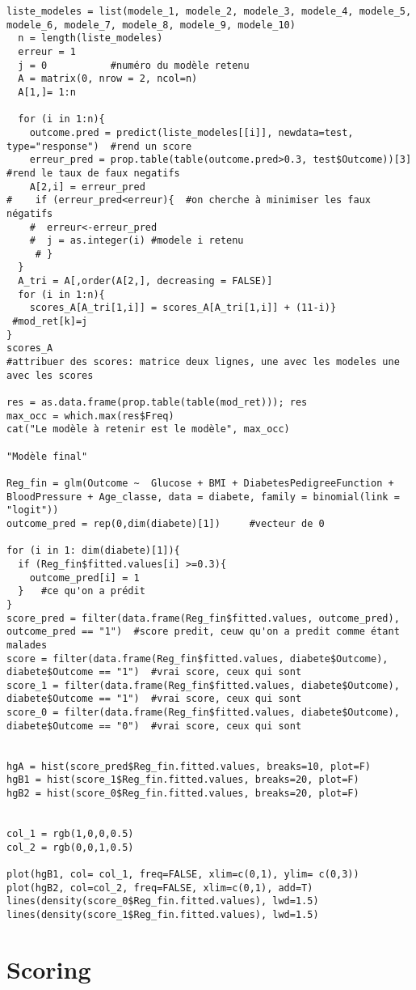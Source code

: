 \documentclass[11pt, oneside]{article}   	%
\begin{document}
\begin{lstlisting}[langage = R]
  liste_modeles = list(modele_1, modele_2, modele_3, modele_4, modele_5, modele_6, modele_7, modele_8, modele_9, modele_10)
  n = length(liste_modeles)
  erreur = 1
  j = 0           #numéro du modèle retenu
  A = matrix(0, nrow = 2, ncol=n)
  A[1,]= 1:n
  
  for (i in 1:n){
    outcome.pred = predict(liste_modeles[[i]], newdata=test, type="response")  #rend un score
    erreur_pred = prop.table(table(outcome.pred>0.3, test$Outcome))[3]   #rend le taux de faux negatifs
    A[2,i] = erreur_pred
#    if (erreur_pred<erreur){  #on cherche à minimiser les faux négatifs 
    #  erreur<-erreur_pred  
    #  j = as.integer(i) #modele i retenu
     # } 
  }
  A_tri = A[,order(A[2,], decreasing = FALSE)]
  for (i in 1:n){ 
    scores_A[A_tri[1,i]] = scores_A[A_tri[1,i]] + (11-i)}
 #mod_ret[k]=j
}
scores_A
#attribuer des scores: matrice deux lignes, une avec les modeles une avec les scores 

res = as.data.frame(prop.table(table(mod_ret))); res
max_occ = which.max(res$Freq)
cat("Le modèle à retenir est le modèle", max_occ)

"Modèle final"

Reg_fin = glm(Outcome ~  Glucose + BMI + DiabetesPedigreeFunction + BloodPressure + Age_classe, data = diabete, family = binomial(link = "logit"))
outcome_pred = rep(0,dim(diabete)[1])     #vecteur de 0  

for (i in 1: dim(diabete)[1]){
  if (Reg_fin$fitted.values[i] >=0.3){
    outcome_pred[i] = 1
  }   #ce qu'on a prédit 
}
score_pred = filter(data.frame(Reg_fin$fitted.values, outcome_pred), outcome_pred == "1")  #score predit, ceuw qu'on a predit comme étant malades
score = filter(data.frame(Reg_fin$fitted.values, diabete$Outcome), diabete$Outcome == "1")  #vrai score, ceux qui sont 
score_1 = filter(data.frame(Reg_fin$fitted.values, diabete$Outcome), diabete$Outcome == "1")  #vrai score, ceux qui sont 
score_0 = filter(data.frame(Reg_fin$fitted.values, diabete$Outcome), diabete$Outcome == "0")  #vrai score, ceux qui sont 


hgA = hist(score_pred$Reg_fin.fitted.values, breaks=10, plot=F)   
hgB1 = hist(score_1$Reg_fin.fitted.values, breaks=20, plot=F)
hgB2 = hist(score_0$Reg_fin.fitted.values, breaks=20, plot=F)


col_1 = rgb(1,0,0,0.5)
col_2 = rgb(0,0,1,0.5)

plot(hgB1, col= col_1, freq=FALSE, xlim=c(0,1), ylim= c(0,3))
plot(hgB2, col=col_2, freq=FALSE, xlim=c(0,1), add=T)
lines(density(score_0$Reg_fin.fitted.values), lwd=1.5)
lines(density(score_1$Reg_fin.fitted.values), lwd=1.5)

\end{lstlisting}

\section{Scoring}
\end{document}
